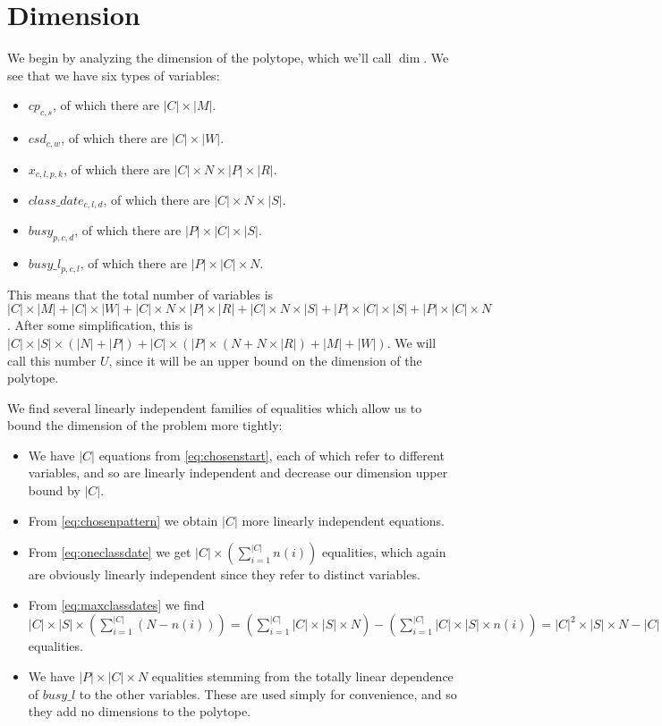 \section{Dimension}

We begin by analyzing the dimension of the polytope, which we'll call $\dim$. We see that we have six types of variables:
\begin{itemize}
\item $cp_{c, s}$, of which there are $|C| \times |M|$.
\item $csd_{c, w}$, of which there are $|C| \times |W|$.
\item $x_{c, l, p, k}$, of which there are $|C| \times N \times |P| \times |R|$.
\item $class\_date_{c, l, d}$, of which there are $|C| \times N \times |S|$.
\item $busy_{p, c, d}$, of which there are $|P| \times |C| \times |S|$.
\item $busy\_l_{p, c, l}$, of which there are $|P| \times |C| \times N$.
\end{itemize}

This means that the total number of variables is $|C| \times |M| + |C| \times |W| + |C| \times N \times |P| \times |R| + |C| \times N \times |S| + |P| \times |C| \times |S| + |P| \times |C| \times N$. After some simplification, this is $|C| \times |S| \times (|N| + |P|) + |C| \times (|P| \times (N + N \times |R|) +|M| + |W|)$. We will call this number $U$, since it will be an upper bound on the dimension of the polytope.


We find several linearly independent families of equalities which allow us to bound the dimension of the problem more tightly:
\begin{itemize}
\item We have $|C|$ equations from \ref{eq:chosenstart}, each of which refer to different variables, and so are linearly independent and decrease our dimension upper bound by $|C|$.
\item From \ref{eq:chosenpattern} we obtain $|C|$ more linearly independent equations.
\item From \ref{eq:oneclassdate} we get $|C| \times (\sum_{i = 1}^{|C|} n(i))$ equalities, which again are obviously linearly independent since they refer to distinct variables.
\item From \ref{eq:maxclassdates} we find $|C| \times |S| \times (\sum_{i=1}^{|C|} (N - n(i))) = (\sum_{i=1}^{|C|} |C| \times |S| \times N) - (\sum_{i=1}^{|C|} |C| \times |S| \times n(i)) = |C|^2 \times |S| \times N - |C| \times |S| \times (\sum_{i = 1}^{|C|} n(i))$ equalities.
\item We have $|P| \times |C| \times N$ equalities stemming from the totally linear dependence of $busy\_l$ to the other variables. These are used simply for convenience, and so they add no dimensions to the polytope.
\end{itemize}

